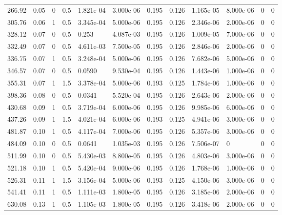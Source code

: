 \documentclass[preview]{standalone}
\begin{document}
{{\begin{tabular}{L{1.2cm}C{1.2cm} C{0.3cm}C{0.5cm} C{1.4cm}C{1.4cm} C{1.4cm}C{1.4cm} C{1.6cm}C{1.6cm} C{1.6cm}C{1.6cm}}
  266.92  &  0.05  & 0     & 0.5 &  1.821e-04  & 3.000e-06  &  0.195&   0.126& 1.165e-05 & 8.000e-06   &  0 & 0  \\ 
  305.76  &  0.06  & 1     & 0.5 &  3.345e-04  & 5.000e-06  &  0.195&   0.126& 2.346e-06 & 2.000e-06   &  0 & 0  \\ 
  328.12  &  0.07  & 0     & 0.5 &  0.253  & 4.087e-03  &  0.195&   0.126& 1.009e-05 & 7.000e-06   &  0 & 0  \\ 
  332.49  &  0.07  & 0     & 0.5 &  4.611e-03  & 7.500e-05  &  0.195&   0.126& 2.846e-06 & 2.000e-06   &  0 & 0  \\ 
  336.75  &  0.07  & 1     & 0.5 &  3.248e-04  & 5.000e-06  &  0.195&   0.126& 7.682e-06 & 5.000e-06   &  0 & 0  \\ 
  346.57  &  0.07  & 0     & 0.5 &  0.0590  & 9.530e-04  &  0.195&   0.126& 1.443e-06 & 1.000e-06   &  0 & 0  \\ 
  355.31  &  0.07  & 1     & 1.5 &  3.378e-04  & 5.000e-06  &  0.193&   0.125& 1.784e-06 & 1.000e-06   &  0 & 0  \\ 
  398.36  &  0.08  & 0     & 0.5 &  0.0341  & 5.520e-04  &  0.195&   0.126& 2.643e-06 & 2.000e-06   &  0 & 0  \\ 
  430.68  &  0.09  & 1     & 0.5 &  3.719e-04  & 6.000e-06  &  0.195&   0.126& 9.985e-06 & 6.000e-06   &  0 & 0  \\ 
  437.26  &  0.09  & 1     & 1.5 &  4.021e-04  & 6.000e-06  &  0.193&   0.125& 4.941e-06 & 3.000e-06   &  0 & 0  \\ 
  481.87  &  0.10  & 1     & 0.5 &  4.117e-04  & 7.000e-06  &  0.195&   0.126& 5.357e-06 & 3.000e-06   &  0 & 0  \\ 
  484.09  &  0.10  & 0     & 0.5 &  0.0641  & 1.035e-03  &  0.195&   0.126& 7.506e-07 & 0   &  0 & 0  \\ 
  511.99  &  0.10  & 0     & 0.5 &  5.430e-03  & 8.800e-05  &  0.195&   0.126& 4.803e-06 & 3.000e-06   &  0 & 0  \\ 
  521.18  &  0.10  & 1     & 0.5 &  5.420e-04  & 9.000e-06  &  0.195&   0.126& 1.768e-06 & 1.000e-06   &  0 & 0  \\ 
  526.31  &  0.11  & 1     & 1.5 &  3.156e-04  & 5.000e-06  &  0.193&   0.125& 4.150e-06 & 3.000e-06   &  0 & 0  \\ 
  541.41  &  0.11  & 1     & 0.5 &  1.111e-03  & 1.800e-05  &  0.195&   0.126& 3.185e-06 & 2.000e-06   &  0 & 0  \\ 
  630.08  &  0.13  & 1     & 0.5 &  1.105e-03  & 1.800e-05  &  0.195&   0.126& 3.418e-06 & 2.000e-06   &  0 & 0  \\ 

\end{tabular}}}
\end{document}

